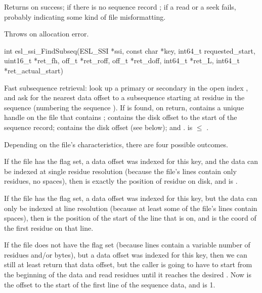 \begin{sreapi}
Returns         on success;
 if there is no sequence record ;
   if a read or a seek fails, probably indicating
some kind of file misformatting.

Throws  on allocation error.


\hypertarget{func:esl_ssi_FindSubseq()}
{\item[int esl\_ssi\_FindSubseq(ESL\_SSI *ssi, const char *key, int64\_t requested\_start,
		   uint16\_t *ret\_fh, off\_t *ret\_roff, off\_t *ret\_doff, int64\_t *ret\_L, int64\_t *ret\_actual\_start)]}

Fast subsequence retrieval: look up a primary or secondary
 in the open index , and ask for the nearest data
offset to a subsequence starting at residue
 in the sequence (numbering the sequence
).  If  is found, on return,  contains
a unique handle on the file that contains ;
 contains the disk offset to the start of the
sequence record;  contains the disk offset
(see below); and .  is $\leq$
.

Depending on the file's characteristics, there are four
possible outcomes.

If the file has the  flag set, a data
offset was indexed for this key, and the data can be
indexed at single residue resolution (because the file's
lines contain only residues, no spaces), then 
is exactly the position of residue  on
disk, and  is .

If the file has the  flag set, a data
offset was indexed for this key, but the data can only be
indexed at line resolution (because at least some of the
file's lines contain spaces), then  is the
position of the start of the line that 
is on, and  is the coord  of the
first residue on that line.

If the file does not have the  flag
set (because lines contain a variable number of residues
and/or bytes), but a data offset was indexed for this
key, then we can still at least return that data offset,
but the caller is going to have to start from the
beginning of the data and read residues until it reaches
the desired . Now  is the
offset to the start of the first line of the sequence
data, and  is 1.


\end{sreapi}
